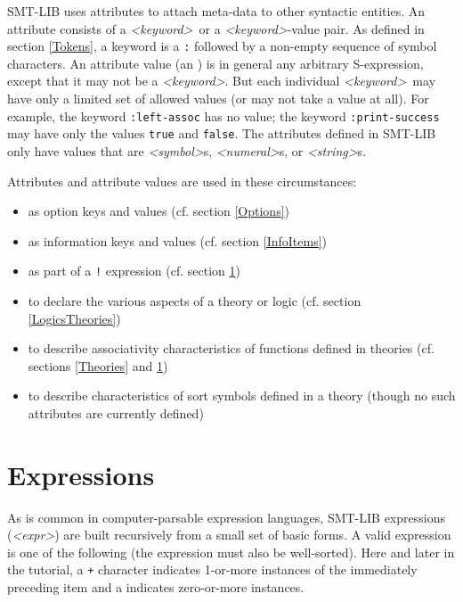 \documentclass[12pt,oneside]{report}
\newcommand{\keyword}{{\it <keyword>}}
\newcommand{\attrvalue}{{\it <attr-value>}}
\newcommand{\expr}{{\it <expr>}}
\newcommand{\sym}{{\it <symbol>}}
\newcommand{\numeral}{{\it <numeral>}}
\newcommand{\strng}{{\it <string>}} %
\newcommand{\nospace}{\setlength{\itemsep}{0in}\setlength{\parsep}{0in}\setlength{\parskip}{0in}\setlength{\topsep}{0in}}
\begin{document}
SMT-LIB uses attributes to attach meta-data to other syntactic entities. An attribute consists of a 
\keyword\ or a \keyword -value pair. As defined in section \ref{Tokens}, a keyword is a {\tt :} followed by
a non-empty sequence of symbol characters. An attribute value (an \attrvalue) is in general any arbitrary S-expression, except that it may not be a \keyword. But each individual \keyword\ may have only a limited set of allowed
values (or may not take a value at all).  For example, the keyword {\tt :left-assoc} has no value; the
keyword {\tt :print-success} may have only the values {\tt true} and {\tt false}. The attributes defined in SMT-LIB only have values that
are \sym s, \numeral s, or \strng s.

Attributes and attribute values are used in these circumstances:
\begin{itemize} \nospace
\item as option keys and values (cf. section \ref{Options})
\item as information keys and values (cf. section \ref{InfoItems})
\item as part of a {\tt !} expression (cf. section \ref{Expressions})
\item to declare the various aspects of a theory or logic (cf. section \ref{LogicsTheories})
\item to describe associativity characteristics of functions defined in theories (cf. sections \ref{Theories} and \ref{Expressions})
\item to describe characteristics of sort symbols defined in a theory (though no such attributes are
currently defined)
\end{itemize}

\section{Expressions}
\label{Expressions}

As is common in computer-parsable expression languages, SMT-LIB expressions (\expr) are built recursively from a small set of basic forms. A valid expression is one of the following (the expression must also be well-sorted).
Here and later in the tutorial, a {\tt +} character indicates 1-or-more instances of the immediately preceding item and a {\tt *} indicates
zero-or-more instances.
\end{document}
